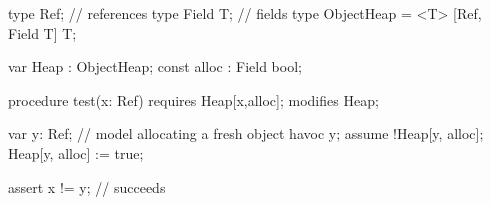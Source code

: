 type Ref; // references
type Field T; // fields
type ObjectHeap = <T> [Ref, Field T] T;

var Heap : ObjectHeap;
const alloc : Field bool;

procedure test(x: Ref)
    requires Heap[x,alloc];
    modifies Heap;
{
    var y: Ref;
    // model allocating a fresh object
    havoc y; 
    assume !Heap[y, alloc];
    Heap[y, alloc] := true;
    
    assert x != y; // succeeds
}